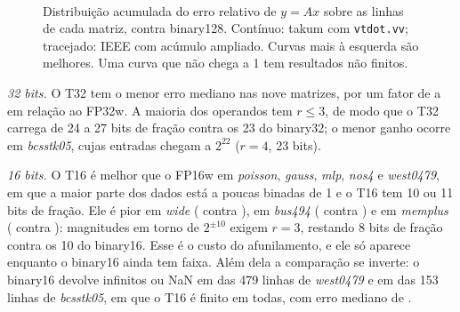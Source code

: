 \documentclass[conference]{IEEEtran}
\newcommand{\code}[1]{\texttt{#1}}
\newcommand{\res}{../../results}
\newcommand{\cdf}[3][]{\addplot+[no markers, #1] table[x=err, y=frac] {\res/cdf_#2_#3.dat};}
\newcommand{\matplot}[2][]{%
  \nextgroupplot[title={#2}, #1]
  \cdf[blue!75!black]{#2}{T8}    \cdf[blue!75!black, dashed]{#2}{FP8w}
  \cdf[red!75!black]{#2}{T16}    \cdf[red!75!black, dashed]{#2}{FP16w}
  \cdf[green!45!black]{#2}{T32}  \cdf[green!45!black, dashed]{#2}{FP32w}}
\begin{document}
\begin{figure}[t]
\centering
{}\\[1.5mm]
\caption{Distribuição acumulada do erro relativo de $y=Ax$ sobre as linhas de cada matriz, contra
binary128. Contínuo: takum com \code{vtdot.vv}; tracejado: IEEE com acúmulo ampliado. Curvas mais à
esquerda são melhores. Uma curva que não chega a 1 tem resultados não finitos.}
\label{fig:cdf}
\end{figure}

\emph{32 bits.} O T32 tem o menor erro mediano nas nove matrizes, por um fator de \RATA{} a \RATB{} em
relação ao FP32w. A maioria dos operandos tem $r\le3$, de modo que o T32 carrega de 24 a 27 bits de
fração contra os 23 do binary32; o menor ganho ocorre em \emph{bcsstk05}, cujas entradas chegam a
$2^{22}$ ($r=4$, 23 bits).

\emph{16 bits.} O T16 é melhor que o FP16w em \emph{poisson}, \emph{gauss}, \emph{mlp}, \emph{nos4} e
\emph{west0479}, em que a maior parte dos dados está a poucas binadas de 1 e o T16 tem 10 ou 11 bits de
fração. Ele é pior em \emph{wide} (\WIDET{} contra \WIDEF{}), em \emph{bus494} (\BUST{} contra
\BUSF{}) e em \emph{memplus} (\MEMTS{} contra \MEMFS{}): magnitudes em torno de $2^{\pm10}$ exigem $r=3$, restando 8 bits de fração contra os 10 do
binary16. Esse é o custo do afunilamento, e ele só aparece enquanto o binary16 ainda tem faixa. Além dela
a comparação se inverte: o binary16 devolve infinitos ou NaN em \NFWESTH{} das 479 linhas de
\emph{west0479} e em \NFBCSH{} das 153 linhas de \emph{bcsstk05}, em que o T16 é finito em todas, com
erro mediano de \BCSTSIXTEEN.
\end{document}
